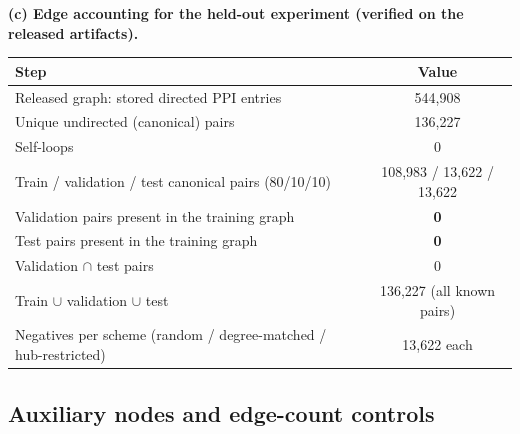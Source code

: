 \documentclass[11pt,a4paper]{article}
\begin{document}
\begin{table}[h]
\smallskip
\textbf{(c) Edge accounting for the held-out experiment (verified on the released artifacts).}
\begin{tabular}{@{}>{\raggedright\arraybackslash}p{}c@{}}
\toprule
\textbf{Step} & \textbf{Value} \\
\midrule
Released graph: stored directed PPI entries & 544,908 \\
Unique undirected (canonical) pairs & 136,227 \\
Self-loops & 0 \\
Train / validation / test canonical pairs (80/10/10) & 108,983 / 13,622 / 13,622 \\
Validation pairs present in the training graph & \textbf{0} \\
Test pairs present in the training graph & \textbf{0} \\
Validation $\cap$ test pairs & 0 \\
Train $\cup$ validation $\cup$ test & 136,227 (all known pairs) \\
Negatives per scheme (random / degree-matched / hub-restricted) & 13,622 each \\
\bottomrule
\end{tabular}

\end{table}

\FloatBarrier


\subsection{Auxiliary nodes and edge-count controls}
\end{document}
